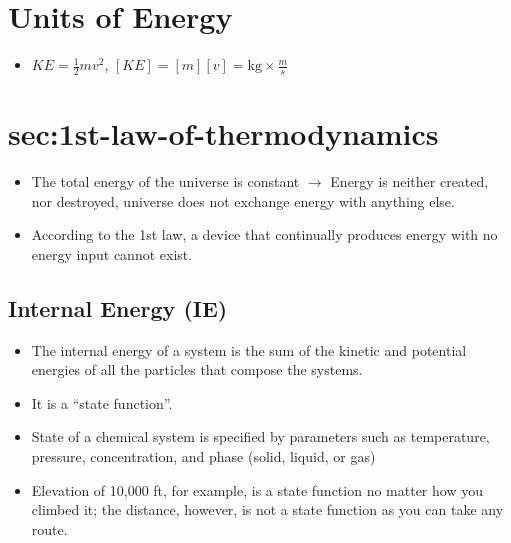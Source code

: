 \documentclass[
	chapter=6,
	title={Thermochemistry},
	showanswers=true,
]{chem122notes}
\begin{document}
\section{Units of Energy}\label{sec:units-of-energy}
\begin{itemize}
	\item $KE = \frac{1}{2}mv^{2}$, $[KE] = [m][v] = \mbox{kg}\times \frac{m}{s}$
\end{itemize}

\section{sec:1st-law-of-thermodynamics}\label{sec:sec:1st-law-of-thermodynamics}
\begin{itemize}
	\item The total energy of the universe is constant $\rightarrow$ Energy is neither created, nor destroyed, universe does not exchange energy with anything else.
	\item According to the 1st law, a device that continually produces energy with no energy input cannot exist.
\end{itemize}

\subsection{Internal Energy (IE)}\label{subsec:internal-energy-(ie)}
\begin{itemize}
	\item The internal energy of a system is the sum of the kinetic and potential energies of all the particles that compose the systems.
	\item It is a ``state function''.
	\item State of a chemical system is specified by parameters such as temperature, pressure, concentration, and phase (solid, liquid, or gas)
	\item Elevation of 10,000 ft, for example, is a state function no matter how you climbed it;
	the distance, however, is not a state function as you can take any route.
\end{itemize}
\end{document}
